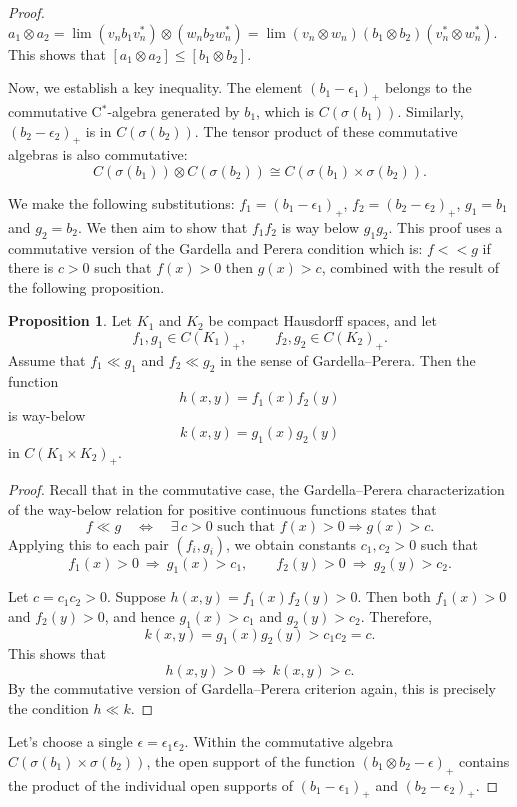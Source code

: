 \documentclass{iopconfser}
\theoremstyle{definition}
\newtheorem{proposition}{Proposition}[section]
\begin{document}
\begin{proof}
$a_1 \otimes a_2=\lim (v_n b_1 v_n^*) \otimes (w_n b_2 w_n^*) =\lim (v_n \otimes w_n)(b_1 \otimes b_2)(v_n^* \otimes w_n^*)$. This shows that $[a_1 \otimes a_2] \leq [b_1 \otimes b_2].$

Now, we establish a key inequality. The element $(b_1-\epsilon_1)_+$  belongs to the commutative C$^*$-algebra generated by $b_1$, which is $C(\sigma (b_1))$. Similarly, $(b_2-\epsilon_2)_+$  is in $C(\sigma(b_2))$. The tensor product of these commutative algebras is also commutative: 
$$C(\sigma(b_1))\otimes C(\sigma(b_2)) \cong C(\sigma(b_1) \times \sigma(b_2)).$$ 

We make the following substitutions: $f_1=(b_1- \epsilon_1)_+$, $f_2=(b_2- \epsilon_2)_+$, $g_1=b_1$ and $g_2=b_2$. We then aim to show that $f_1f_2$ is way below $g_1g_2$. This proof uses a commutative version of the Gardella and Perera condition which is: $f <<g$  if there is $c>0$ such that $f(x)>0$ then $g(x)>c$, combined with the result of the following proposition.

\begin{proposition}
Let $K_1$ and $K_2$ be compact Hausdorff spaces, and let 
\[
f_1, g_1 \in C(K_1)_+, \qquad f_2, g_2 \in C(K_2)_+.
\]
Assume that $f_1 \ll g_1$ and $f_2 \ll g_2$ in the sense of Gardella--Perera.  
Then the function
\[
h(x,y) = f_1(x) f_2(y)
\]
is way-below
\[
k(x,y) = g_1(x) g_2(y)
\]
in $C(K_1 \times K_2)_+$.
\end{proposition}

\begin{proof}
Recall that in the commutative case, the Gardella--Perera characterization of the way-below relation for positive continuous functions states that
\[
f \ll g \quad \Longleftrightarrow \quad 
\exists\, c>0 \text{ such that } f(x)>0 \Rightarrow g(x)>c.
\]
Applying this to each pair $(f_i, g_i)$, we obtain constants $c_1, c_2 > 0$ such that
\[
f_1(x)>0 \ \Rightarrow\ g_1(x)>c_1, 
\qquad 
f_2(y)>0 \ \Rightarrow\ g_2(y)>c_2.
\]

Let $c = c_1 c_2 > 0$.  
Suppose $h(x,y) = f_1(x) f_2(y) > 0$.  
Then both $f_1(x)>0$ and $f_2(y)>0$, and hence $g_1(x)>c_1$ and $g_2(y)>c_2$.  
Therefore,
\[
k(x,y) = g_1(x) g_2(y) > c_1 c_2 = c.
\]
This shows that
\[
h(x,y)>0 \ \Rightarrow\ k(x,y)>c.
\]
By the commutative version of Gardella--Perera criterion again, this is precisely the condition $h \ll k$.
\end{proof}




    Let's choose a single $\epsilon =\epsilon_1\epsilon_2$.
    Within the commutative algebra $C(\sigma (b_1)\times \sigma (b_2))$, the open support of the function $(b_1 \otimes b_2-\epsilon)_+$  contains the product of the individual open supports of $(b_1-\epsilon_1)_+$  and $(b_2-\epsilon_2)_+$.


\end{proof}
\end{document}
